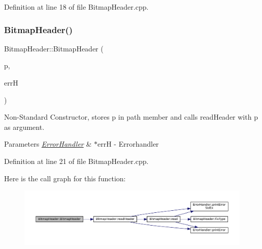 Definition at line 18 of file Bitmap\+Header.\+cpp.

\mbox{\label{classBitmapHeader_a2cf57f049eae7d2ee93d5749d678aca5}} 
\subsubsection{\texorpdfstring{BitmapHeader()}{BitmapHeader()}\hspace{0.1cm}{\footnotesize\ttfamily [2/4]}}
{\footnotesize\ttfamily Bitmap\+Header\+::\+Bitmap\+Header (\begin{DoxyParamCaption}\item[{std\+::string}]{p,  }\item[{\mbox{\hyperlink{classErrorHandler}{Error\+Handler}} $\ast$}]{errH }\end{DoxyParamCaption})}



Non-\/\+Standard Constructor, stores p in path member and calls read\+Header with p as argument. 


\begin{DoxyParams}{Parameters}
{\em \mbox{\hyperlink{classErrorHandler}{Error\+Handler}}} & $\ast$errH -\/ Errorhandler \\
\hline
\end{DoxyParams}


Definition at line 21 of file Bitmap\+Header.\+cpp.

Here is the call graph for this function\+:\nopagebreak
\begin{figure}[H]
\begin{center}
\leavevmode
\includegraphics[width=350pt]{classBitmapHeader_a2cf57f049eae7d2ee93d5749d678aca5_cgraph}
\end{center}
\end{figure}
\mbox{\label{classBitmapHeader_aa0bf5c2238f213b36d7b85d4b7f90be1}} 
